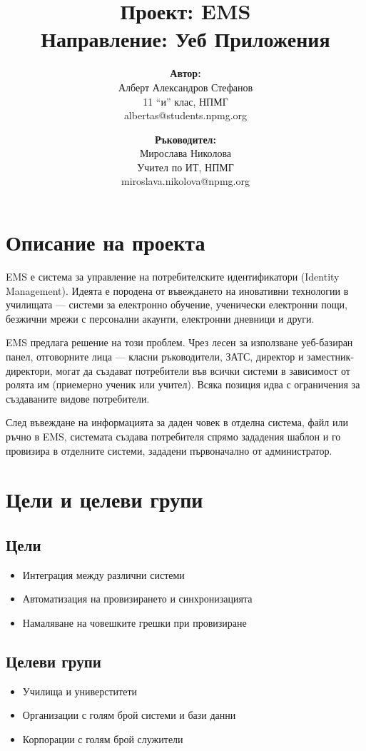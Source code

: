 \documentclass[bulgarian,a4paper,12pt,titlepage]{article}
\title{%
Проект: EMS \\
\large Направление: Уеб Приложения}
\author{%
\textbf{Автор:} \\
Алберт Александров Стефанов \\
11 ``и'' клас, НПМГ \\
albertas@students.npmg.org \\
\and
\textbf{Ръководител:} \\
Мирослава Николова \\
Учител по ИТ, НПМГ \\
miroslava.nikolova@npmg.org}
\date{}
\begin{document}
    \maketitle
    \newpage
    \tableofcontents
    \newpage
    
    \section{Описание на проекта}
        EMS е система за управление на потребителските идентификатори (Identity Management). Идеята е породена от въвеждането на иновативни технологии в училищата --- системи за електронно обучение, ученически електронни пощи, безжични мрежи с персонални акаунти, електронни дневници и други. \par
        EMS предлага решение на този проблем. Чрез лесен за използване уеб-базиран панел, отговорните лица --- класни ръководители, ЗАТС, директор и заместник-директори, могат да създават потребители във всички системи в зависимост от ролята им (приемерно ученик или учител). Всяка позиция идва с ограничения за създаваните видове потребители. \par
        След въвеждане на информацията за даден човек в отделна система, файл или ръчно в EMS, системата създава потребителя спрямо зададения шаблон и го провизира в отделните системи, зададени първоначално от администратор.
    
    \section{Цели и целеви групи}
        \subsection{Цели}
            \begin{itemize}
                \item Интеграция между различни системи
                \item Автоматизация на провизирането и синхронизацията
                \item Намаляване на човешките грешки при провизиране
            \end{itemize}

        \subsection{Целеви групи}
            \begin{itemize}
                \item Училища и универститети
                \item Организации с голям брой системи и бази данни
                \item Корпорации с голям брой служители
            \end{itemize}
    
\end{document}
